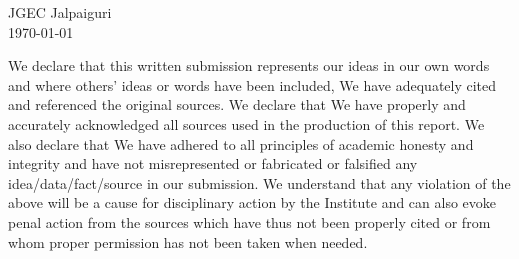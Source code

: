 %
\begin{Declaration}
\begin{flushright}
JGEC Jalpaiguri\\
 \today
\end{flushright}
\vspace*{0.5cm}

\noindent
We declare that this written submission represents our ideas in our own words and where others' ideas or words have been included, We have adequately cited and referenced the original sources. We declare that We have properly and accurately acknowledged all sources used in the production of this report. We also declare that We have adhered to all principles of academic honesty and integrity and have not misrepresented or fabricated or falsified any idea/data/fact/source in our submission. We understand that any violation of the above will be a cause for disciplinary action by the Institute and can also evoke penal action from the sources which have thus not been properly cited or from whom proper permission has not been taken when needed. 

\DecSign

%
\end{Declaration}
















